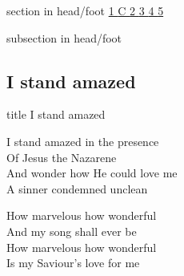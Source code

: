 \documentclass[aspectratio=169]{beamer}
\begin{document}
{
{ 
 {
 \begin{beamercolorbox}[ht=4.5ex,dp=1.5ex,%
      leftskip=.3cm,rightskip=.3cm plus1fil]{section in head/foot}
 \fontsize{12}{25}\selectfont 
\hyperlink{I stand amazed['How marvelous']1}{1  }\hyperlink{I stand amazed['How marvelous']C}{C  }\hyperlink{I stand amazed['How marvelous']2}{2  }\hyperlink{I stand amazed['How marvelous']3}{3  }\hyperlink{I stand amazed['How marvelous']4}{4  }\hyperlink{I stand amazed['How marvelous']5}{5  } 
 \end{beamercolorbox}%
  \begin{beamercolorbox}[ht=2.5ex,dp=1.125ex,%
   leftskip=.3cm,rightskip=.3cm plus1fil]{subsection in head/foot}
   \insertauthor
 \end{beamercolorbox}%
 }
}
\subsection{I stand amazed}
\hypertarget{I stand amazed['How marvelous']}{}
\begin{frame}{}
 \vfill
  \centering
  \begin{beamercolorbox}[sep=8pt,center,shadow=true,rounded=true]{title}
    I stand amazed     
  \end{beamercolorbox}
  \vfill
\end{frame}

\hypertarget{I stand amazed['How marvelous']1}{}
\begin{frame}{}
\fontsize{26.470588235294116}{31.76470588235294}\selectfont

I stand amazed in the presence\\ 
Of Jesus the Nazarene\\ 
And wonder how He could love me\\ 
A sinner condemned unclean

\end{frame}
\hypertarget{I stand amazed['How marvelous']C}{}
\begin{frame}{}
\fontsize{26.470588235294116}{31.76470588235294}\selectfont

How marvelous how wonderful\\ 
And my song shall ever be\\ 
How marvelous how wonderful\\ 
Is my Saviour's love for me


\end{frame}}
\end{document}
